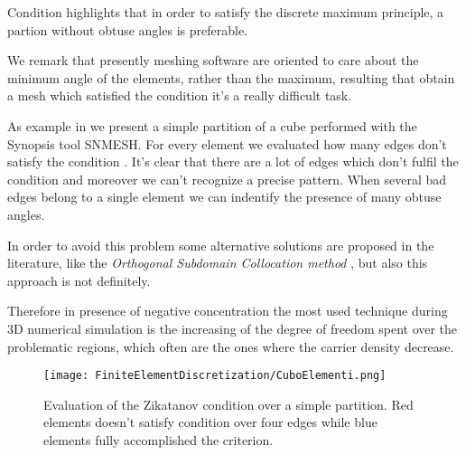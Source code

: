 \begin{Osservazione}
Condition  highlights that in order to satisfy the discrete maximum principle, a partion without obtuse angles is preferable.
\end{Osservazione}

We remark that presently meshing software are oriented to care about the minimum angle of the elements, rather than the maximum, resulting that obtain a mesh which satisfied the condition  it's a really difficult task. 

As example in  we present a simple partition of a cube performed with the Synopsis tool SNMESH. For every element we evaluated how many edges don't satisfy the condition .
It's clear that there are a lot of edges which don't fulfil the condition and moreover we can't recognize a precise pattern. When several bad edges belong to a single element we can indentify the presence of many obtuse angles.

In order to avoid this problem some alternative solutions are proposed in the literature, like the \textit{Orthogonal Subdomain Collocation method} \cite{OSCputticorded}, but also this approach is not definitely. 

Therefore in presence of negative concentration the most used technique during 3D numerical simulation is the increasing of the degree of freedom spent over the problematic regions, which often are the ones where the carrier density decrease.



\begin{figure}[!b]
\centering
{\texttt{[image: FiniteElementDiscretization/CuboElementi.png]}}
\caption{Evaluation of the Zikatanov condition over a simple partition. Red elements doesn't satisfy condition   over four edges while blue elements fully accomplished the criterion.}
\label{fig: cubo zikatanov}
\end{figure}


